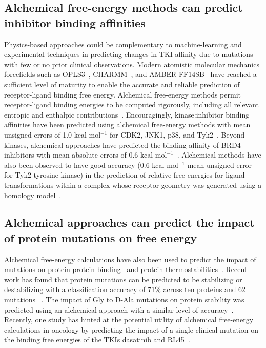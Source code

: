 \documentclass[phd,tocprelim]{cornell}
\begin{document}
\subsection{Alchemical free-energy methods can predict inhibitor binding affinities}
Physics-based approaches could be complementary to machine-learning and experimental techniques in predicting changes in TKI affinity due to mutations with few or no prior clinical observations.
Modern atomistic molecular mechanics forcefields such as OPLS3~\citep{Harder:J.Chem.TheoryComput.:2016}, CHARMM~\citep{Huang:J.Comput.Chem.:2013}, and AMBER FF14SB~\citep{Maier:J.Chem.TheoryComput.:2015} have reached a sufficient level of maturity to enable the accurate and reliable prediction of receptor-ligand binding free energy.
Alchemical free-energy methods permit receptor-ligand binding energies to be computed rigorously, including all relevant entropic and enthalpic contributions~\citep{Chodera:Curr.Opin.Struct.Biol.:2011}.
Encouragingly, kinase:inhibitor binding affinities have been predicted using alchemical free-energy methods with mean unsigned errors of 1.0 kcal mol$^{-1}$ for CDK2, JNK1, p38, and Tyk2~\citep{Wang:J.Am.Chem.Soc.:2015,abel2017accelerating}.
Beyond kinases, alchemical approaches have predicted the binding affinity of BRD4 inhibitors with mean absolute errors of 0.6 kcal mol$^{-1}$~\citep{Aldeghi:ChemSci:2016}.
Alchemical methods have also been observed to have good accuracy (0.6 kcal mol$^{-1}$ mean unsigned error for Tyk2 tyrosine kinase) in the prediction of relative free energies for ligand transformations within a complex whose receptor geometry was generated using a homology model~\citep{cappel2016}.

\subsection{Alchemical approaches can predict the impact of protein mutations on free energy}
Alchemical free-energy calculations have also been used to predict the impact of mutations on protein-protein binding~\citep{clark2017free} and protein thermostabilities~\citep{steinbrecher2017predicting}.
Recent work has found that protein mutations can be predicted to be stabilizing or destabilizing with a classification accuracy of 71\% across ten proteins and 62 mutations ~\citep{Ford:J.Chem.Inf.Model.:2017}.  
The impact of Gly to D-Ala mutations on protein stability was predicted using an alchemical approach with a similar level of accuracy~\citep{Zou:J.Am.Chem.Soc.:2016}.
Recently, one study has hinted at the potential utility of alchemical free-energy calculations in oncology by predicting the impact of a single clinical mutation on the binding free energies of the TKIs dasatinib and RL45~\citep{mondal2016}.
\end{document}
